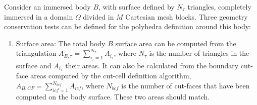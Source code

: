 \documentclass[11pt]{book}
\begin{document}
Consider an immersed body $B$, with surface defined by $N_\tau$ triangles, completely immersed in a domain $\Omega$ divided in $M$ Cartesian mesh blocks.
Three geometry conservation tests can be defined for the polyhedra definition around this body:
%
\begin{enumerate}

    \item Surface area:
    The total body $B$ surface area can be computed from the triangulation $A_{B,\tau}=\sum_{i_\tau=1}^{N_\tau}{A_{i_\tau}}$, where $N_\tau$ is the number of triangles in the surface and $A_{i_\tau}$ their areas. It can also be calculated from the boundary cut-face areas computed by the cut-cell definition algorithm,  $A_{B,CF}=\sum_{icf=1}^{N_{bcf}}{A_{icf}}$, where $N_{bcf}$ is the number of cut-faces that have been computed on the body surface. These two areas should match.
    \newline


\end{enumerate}
\end{document}
